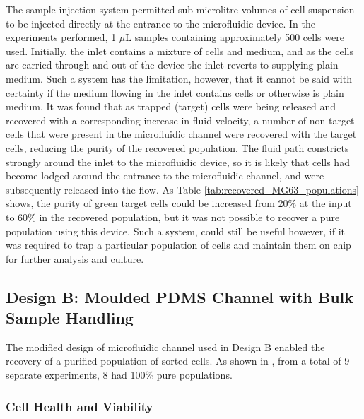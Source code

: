 The sample injection system permitted sub-microlitre volumes of cell suspension to be injected directly at the entrance to the microfluidic device. In the experiments performed, 1 $\mu$L samples containing approximately 500 cells were used. Initially, the inlet contains a mixture of cells and medium, and as the cells are carried through and out of the device the inlet reverts to supplying plain medium. Such a system has the limitation, however, that it cannot be said with certainty if the medium flowing in the inlet contains cells or otherwise is plain medium. It was found that as trapped (target) cells were being released and recovered with a corresponding increase in fluid velocity, a number of non-target cells that were present in the microfluidic channel were recovered with the target cells, reducing the purity of the recovered population. The fluid path constricts strongly around the inlet to the microfluidic device, so it is likely that cells had become lodged around the entrance to the microfluidic channel, and were subsequently released into the flow. As Table \ref{tab:recovered_MG63_populations} shows, the purity of green target cells could be increased from 20$\%$ at the input to 60$\%$ in the recovered population, but it was not possible to recover a pure population using this device. Such a system, could still be useful however, if it was required to trap a particular population of cells and maintain them on chip for further analysis and culture.


\subsection{Design B: Moulded PDMS Channel with Bulk Sample Handling}

The modified design of microfluidic channel used in Design B enabled the recovery of a purified population of sorted cells. As shown in , from a total of 9 separate experiments, 8 had 100\% pure populations.

\subsubsection{Cell Health and Viability}

